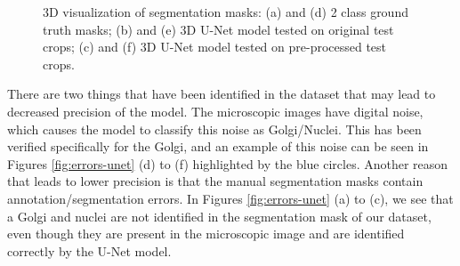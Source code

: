 \begin{figure}[!htb]
\hfil 
{}\hfil
{}
\caption{3D visualization of segmentation masks: (a) and (d) 2 class ground truth masks; (b) and (e) \ac{3D} U-Net model tested on original test crops; (c) and (f) \ac{3D} U-Net model tested on pre-processed test crops.}

\label{fig:results-unet}

\end{figure}

There are two things that have been identified in the dataset that may lead to decreased precision of the model. The microscopic images have digital noise, which causes the model to classify this noise as Golgi/Nuclei. This has been verified specifically for the Golgi, and an example of this noise can be seen in Figures \ref{fig:errors-unet} (d) to (f) highlighted by the blue circles. Another reason that leads to lower precision is that the manual segmentation masks contain annotation/segmentation errors. In Figures \ref{fig:errors-unet} (a) to (c), we see that a Golgi and nuclei are not identified in the segmentation mask  of our dataset, even though they are present in the microscopic image and are identified correctly by the U-Net model.

